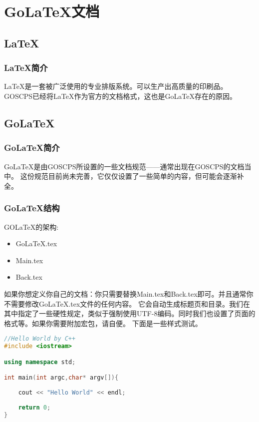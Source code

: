 \chapter{Go\LaTeX{}文档}
\section{\LaTeX{}}
\subsection{\LaTeX{}简介}

\LaTeX{}是一套被广泛使用的专业排版系统。可以生产出高质量的印刷品。
GOSCPS已经将\LaTeX{}作为官方的文档格式，这也是Go\LaTeX{}存在的原因。

\section{Go\LaTeX{}}
\subsection{Go\LaTeX{}简介}
Go\LaTeX{}是由GOSCPS所设置的一些文档规范——通常出现在G\-OS\-CP\-S的文档当中。
这份规范目前尚未完善，它仅仅设置了一些简单的内容，但可能会逐渐补全。

\subsection{Go\LaTeX{}结构}
GO\LaTeX{}的架构:

\begin{itemize}
    \item Go\LaTeX{}.tex
    \item Main.tex
    \item Back.tex
\end{itemize}

如果你想定义你自己的文档：你只需要替换Main.tex和Back.tex即可。并且通常你不需要修改Go\LaTeX{}.tex文件的任何内容。
它会自动生成标题页和目录。我们在其中指定了一些硬性规定，类似于强制使用UTF-8编码。同时我们也设置了页面的格式等。如果你需要附加宏包，请自便。
\newline{}
下面是一些样式测试。

\begin{lstlisting}[language=C++]
//Hello World by C++
#include <iostream>

using namespace std;

int main(int argc,char* argv[]){
	
	cout << "Hello World" << endl;
	
	return 0;
}
\end{lstlisting}

